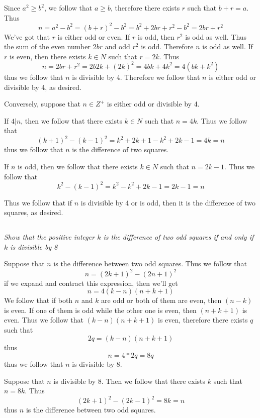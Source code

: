 \documentclass[11pt,oneside,titlepage]{book}
\begin{document}
Since $a^2 \geq b^2$, we follow that $a \geq b$, therefore there exists $r$ such that
$b + r = a$. Thus
$$n = a^2 - b^2 = (b + r)^2 - b^2 = b^2 + 2br + r^2 - b^2 = 2br + r^2$$
We've got that $r$ is either odd or even. If $r$ is odd, then $r^2$ is odd as well. Thus
the sum of the even number $2br$ and odd $r^2$ is odd. Therefore $n$ is odd as well.
If $r$ is even, then there exists $k \in N$ such that $r = 2k$. Thus
$$n = 2br + r^2 = 2b2k + (2k)^2 = 4bk + 4k^2 = 4(bk + k^2)$$
thus we follow that $n$ is divisible by 4. Therefore we follow that $n$ is either
odd or divisible by 4, as desired.

Conversely, suppose that $n \in Z^+$ is either odd or divisible by 4.

If $4|n$, then we follow that there exists $k \in N$ such that $n = 4k$. Thus
we follow that
$$(k + 1)^2 - (k - 1)^2 = k^2 + 2k + 1 - k^2 + 2k - 1 = 4k = n$$
thus we follow that $n$ is the difference of two squares.

If $n$ is odd, then we follow that there exists $k \in N$  such that $n = 2k - 1$. Thus
we follow that
$$k^2 - (k - 1)^2 = k^2 - k^2 + 2k - 1 = 2k - 1 = n$$

Thus we follow that if $n$ is divisible by 4 or is odd, then it is the difference of two squares,
as desired.

\subsection{}

\textit{Show that the positive integer $k$ is the difference of two odd squares if and
  only if $k$ is divisible by 8}

Suppose that $n$ is the difference between two odd squares. Thus we follow that
$$n = (2k + 1)^2 - (2n + 1)^2$$
if we expand and contract this expression, then we'll get
$$n = 4(k - n)(n + k + 1)$$
We follow that if both $n$ and $k$ are odd or both of them are even, then $(n - k)$ is even.
If one of them is odd while the other one is even, then $(n + k + 1)$ is even. Thus we
follow that $(k - n)(n + k + 1)$ is even, therefore there exists $q$ such that
$$2q = (k - n)(n + k + 1)$$
thus
$$n = 4 * 2q = 8q$$
thus we follow that $n$ is divisible by 8.

Suppose that $n$ is divisible by 8. Then we follow that there exists $k$ such that
$n = 8k$. Thus
$$(2k + 1)^2 - (2 k - 1)^2 = 8k = n$$
thus $n$ is the difference between two odd squares.

\subsection{}
\end{document}
